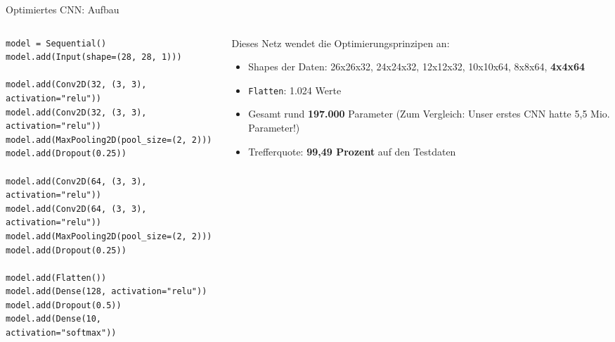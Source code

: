 \begin{frame}[fragile]{Optimiertes CNN: Aufbau}
\footnotesize
\begin{columns}
\begin{column}{0.6\linewidth}
\begin{verbatim}
model = Sequential()
model.add(Input(shape=(28, 28, 1)))

model.add(Conv2D(32, (3, 3), activation="relu"))
model.add(Conv2D(32, (3, 3), activation="relu"))
model.add(MaxPooling2D(pool_size=(2, 2)))
model.add(Dropout(0.25))

model.add(Conv2D(64, (3, 3), activation="relu"))
model.add(Conv2D(64, (3, 3), activation="relu"))
model.add(MaxPooling2D(pool_size=(2, 2)))
model.add(Dropout(0.25))

model.add(Flatten())
model.add(Dense(128, activation="relu"))
model.add(Dropout(0.5))
model.add(Dense(10, activation="softmax"))
\end{verbatim}
\end{column}
\begin{column}{0.35\linewidth}

Dieses Netz wendet die Optimierungsprinzipen an:
\begin{itemize}
  \item Shapes der Daten: 26x26x32, 24x24x32, 12x12x32, 10x10x64, 8x8x64, \textbf{4x4x64}
  \item \texttt{Flatten}: 1.024 Werte
  \item Gesamt rund \textbf{197.000} Parameter (Zum Vergleich: Unser erstes CNN hatte 5,5 Mio. Parameter!)
  \item Trefferquote: \textbf{99,49  Prozent} auf den Testdaten
\end{itemize}
\end{column}
\end{columns}
\end{frame}


